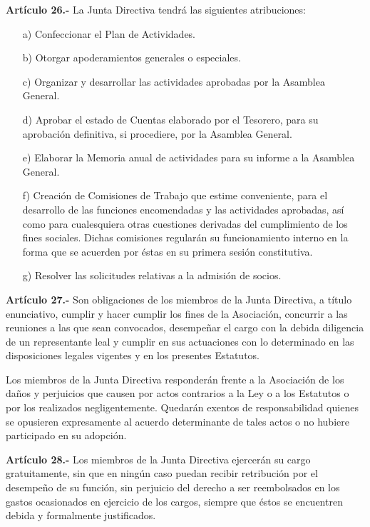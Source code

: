 \documentclass[a4paper,12pt]{article}
\begin{document}
\begin{onehalfspace}
\textbf{Art\'iculo 26.-} La Junta Directiva tendr\'a las siguientes atribuciones:
\begin{itemize}
\item [a)] Confeccionar el Plan de Actividades.
\item [b)] Otorgar apoderamientos generales o especiales.
\item [c)] Organizar y desarrollar las actividades aprobadas por la Asamblea General.
\item [d)] Aprobar el estado de Cuentas elaborado por el Tesorero, para su aprobaci\'on definitiva, si procediere, por la Asamblea General.
\item [e)] Elaborar la Memoria anual de actividades para su informe a la Asamblea General.
\item [f)] Creaci\'on de Comisiones de Trabajo que estime conveniente, para el desarrollo de las funciones encomendadas y las actividades aprobadas, as\'i como para cualesquiera otras cuestiones derivadas del cumplimiento de los fines sociales. Dichas comisiones regular\'an su funcionamiento interno en la forma que se acuerden por \'estas en su primera sesi\'on constitutiva.
\item [g)] Resolver las solicitudes relativas a la admisi\'on de socios.
\end{itemize}

\bigskip\bigskip

\textbf{Art\'iculo 27.-} Son obligaciones de los miembros de la Junta Directiva, a t\'itulo enunciativo, cumplir y hacer cumplir los fines de la Asociaci\'on, concurrir a las reuniones a las que sean convocados, desempe\~nar el cargo con la debida diligencia de un representante leal y cumplir en sus actuaciones con lo determinado en las disposiciones legales vigentes y en los presentes Estatutos.

Los miembros de la Junta Directiva responder\'an frente a la Asociaci\'on de los da\~nos y perjuicios que causen por actos contrarios a la Ley o a los Estatutos o por los realizados negligentemente. Quedar\'an exentos de responsabilidad quienes se opusieren expresamente al acuerdo determinante de tales actos o no hubiere participado en su adopci\'on.

\bigskip\bigskip

\textbf{Art\'iculo 28.-} Los miembros de la Junta Directiva ejercer\'an su cargo gratuitamente, sin que en ning\'un caso puedan recibir retribuci\'on por el desempe\~no de su funci\'on, sin perjuicio del derecho a ser reembolsados en los gastos ocasionados en ejercicio de los cargos, siempre que \'estos se encuentren debida y formalmente justificados.


\end{onehalfspace}
\end{document}

